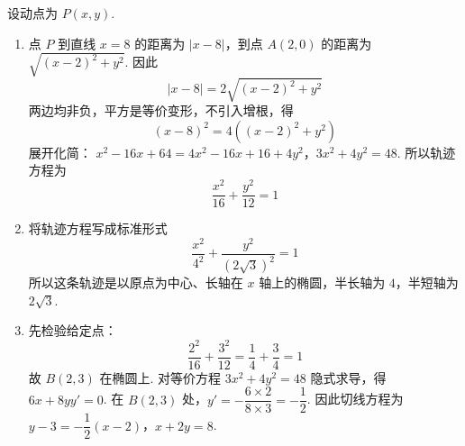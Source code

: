\begin{solution}
设动点为 \(P\left(x,y\right)\).
\begin{enumerate}
\item 点 \(P\) 到直线 \(x=8\) 的距离为 \(\left|x-8\right|\)，到点 \(A\left(2,0\right)\) 的距离为 \(\sqrt{\left(x-2\right)^2+y^2}\). 因此
\[
\left|x-8\right|=2\sqrt{\left(x-2\right)^2+y^2}
\]
两边均非负，平方是等价变形，不引入增根，得
\[
\left(x-8\right)^2=4\left(\left(x-2\right)^2+y^2\right)
\]
展开化简：
\(x^2-16x+64=4x^2-16x+16+4y^2\)，\(3x^2+4y^2=48\).
所以轨迹方程为
\[
\dfrac{x^2}{16}+\dfrac{y^2}{12}=1
\]

\item 将轨迹方程写成标准形式
\[
\dfrac{x^2}{4^2}+\dfrac{y^2}{\left(2\sqrt3\right)^2}=1
\]
所以这条轨迹是以原点为中心、长轴在 \(x\) 轴上的椭圆，半长轴为 \(4\)，半短轴为 \(2\sqrt3\).

\item 先检验给定点：
\[
\dfrac{2^2}{16}+\dfrac{3^2}{12}=\dfrac14+\dfrac34=1
\]
故 \(B\left(2,3\right)\) 在椭圆上. 对等价方程 \(3x^2+4y^2=48\) 隐式求导，得 \(6x+8yy'=0\). 在 \(B\left(2,3\right)\) 处，\(y'=-\dfrac{6\times2}{8\times3}=-\dfrac12\).
因此切线方程为
\(y-3=-\dfrac12\left(x-2\right)\)，\(x+2y=8\).
\end{enumerate}
\end{solution}
